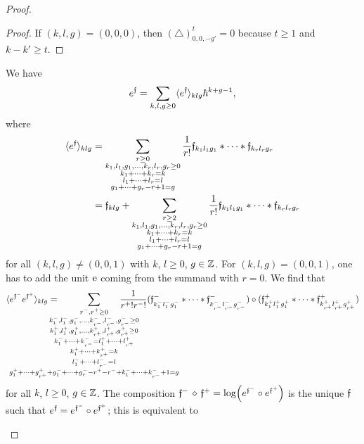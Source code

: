 \documentclass[\MainFolder/Text.tex]{subfiles}
\begin{document}
\begin{proof}
\begin{ProofList}
\begin{proof}
If $(k,l,g) = (0,0,0)$, then $(\triangle)^t_{0,0,-g'} = 0$ because $t\ge 1$ and $k-k'\ge t$.\renewcommand{\qed}{\hfill\textit{(Subclaim) }$\square$}
\end{proof}
\item We have
$$ e^{\mathfrak{f}} = \sum_{k,l,g\ge 0} \langle e^{\mathfrak{f}} \rangle_{klg} \hbar^{k+g-1}, $$
where
\begin{align}
\langle e^{\mathfrak{f}}\rangle_{klg} &= \sum_{\substack{r\ge 0 \\ k_1, l_1, g_1, \dotsc, k_r, l_r, g_r \ge 0 \\ k_1 + \dotsb + k_r = k \\ l_1 + \dotsb + l_r = l \\ g_1 + \dotsb + g_r - r + 1 = g}} \frac{1}{r!} \mathfrak{f}_{k_1 l_1 g_1}*\dotsb*\mathfrak{f}_{k_r l_r g_r} \nonumber \\
& = \mathfrak{f}_{klg} + \sum_{\substack{r\ge 2 \\ k_1, l_1, g_1, \dotsc, k_r, l_r, g_r \ge 0 \\ k_1 + \dotsb + k_r = k \\ l_1 + \dotsb + l_r = l \\ g_1 + \dotsb + g_r - r + 1 = g}} \frac{1}{r!} \mathfrak{f}_{k_1 l_1 g_1}*\dotsb*\mathfrak{f}_{k_r l_r g_r} \label{Eq:ComponentOfExpo}
\end{align}
for all $(k,l,g)\neq (0,0,1)$ with $k$, $l\ge 0$, $g\in\mathbb{Z}$. For $(k,l,g) = (0,0,1)$, one has to add the unit $\mathrm{e}$ coming from the summand with $r=0$. We find that
$$\langle e^{\MVMorF^-}e^{\MVMorF^+}\rangle_{klg} = \hspace{-2cm}\sum_{\substack{r^-, r^+ \ge 0 \\ k_{1}^-, l_1^-, g_1^-, \dotsc, k_{r^-}^-, l_{r^-}^-, g_{r^-}^- \ge 0 \\ k_{1}^+, l_1^+, g_1^+, \dotsc, k_{r^+}^+, l_{r^+}^+, g_{r^+}^+ \ge 0 \\ k_1^- + \dotsb + k^-_{r^-} = l_1^+ + \dotsb + l_{r^+}^+ \\ k_1^+ + \dotsb + k_{r^+}^+ = k \\ l_1^- + \dotsb + l_{r^-}^- = l \\ g_1^+ + \dotsb + g_{r^+}^+ + g_1^- + \dotsb + g_r^- - r^+ - r^- + k_1^- + \dotsb + k_{r^-}^- + 1 = g}}\hspace{-2.4cm}\frac{1}{r^+! r^-!} (\HTP^-_{k_1^- l_1^- g_1^-} \Star \dotsb \Star \HTP^-_{k_{r^-}^- l_{r^-}^- g_{r^-}^-})\circ (\HTP^+_{k_1^+ l_1^+ g_1^+} \Star \dotsb \Star \HTP^+_{k_{r^+}^+ l_{r^+}^+ g_{r^+}^+})$$
for all $k$, $l\ge 0$, $g\in \mathbb{Z}$. The composition $\MVMorF^-\DiamComp\MVMorF^+ = \log(e^{\MVMorF^-}\circ e^{\MVMorF^+})$ is the unique $\mathfrak{f}$ such that $e^{\mathfrak{f}} = e^{\mathfrak{f}^-}\circ e^{\mathfrak{f}^+}$; this is equivalent to 

\end{ProofList}
\end{proof}
\end{document}
